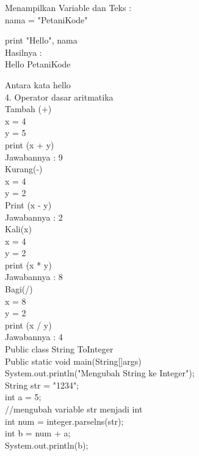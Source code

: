 Menampilkan Variable dan Teks : \\

nama = "PetaniKode"

print "Hello", nama\\

Hasilnya :\\ 

Hello PetaniKode

Antara kata hello \\
4. Operator dasar aritmatika \\
Tambah (+)\\
x = 4\\
y = 5\\
print (x + y)\\
Jawabannya : 9\\
Kurang(-)\\
x = 4\\
y = 2\\
Print (x - y)\\
Jawabannya : 2\\
Kali(x)\\
x = 4\\
y = 2\\
print (x * y)\\
Jawabannya : 8\\
Bagi(/)\\
x = 8\\
y = 2\\
print (x / y)\\
Jawabannya : 4\\

Public class String ToInteger{\\
    Public static void main(String[]args) {\\
        System.out.println("Mengubah String ke Integer");\\
        
        String str = "1234";\\
        int a = 5;\\
        //mengubah variable str menjadi int \\
        int num = integer.parselns(str);\\
        
        int b = num + a;\\
        System.out.println(b);\\
        }\\
        }\\
        
